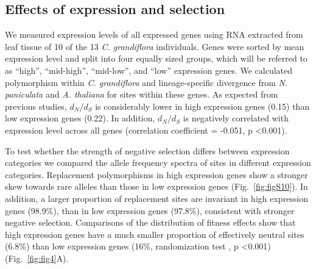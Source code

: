 \subsection{Effects of expression and selection}
We measured expression levels of all expressed genes using RNA extracted from leaf tissue of 10 of the 13 \textit{C. grandiflora} individuals. Genes were sorted by mean expression level and split into four equally sized groups, which will be referred to as “high”, “mid-high”, “mid-low”, and “low” expression genes. We calculated polymorphism within \textit{C. grandiflora} and lineage-specific divergence from \textit{N. paniculata} and \textit{A. thaliana} for sites within these genes. As expected from previous studies, $d_{N}/d_{S}$ is considerably lower in high expression genes (0.15) than low expression genes (0.22).  In addition, $d_{N}/d_{S}$ is negatively correlated with expression level across all genes (correlation coefficient = -0.051, p \textless 0.001).

To test whether the strength of negative selection differs between expression categories we compared the allele frequency spectra of sites in different expression categories. Replacement polymorphisms in high expression genes show a stronger skew towards rare alleles than those in low expression genes (Fig.~\ref{fig:figS10}). In addition, a larger proportion of replacement sites are invariant in high expression genes (98.9\%), than in low expression genes (97.8\%), consistent with stronger negative selection. Comparisons of the distribution of fitness effects show that high expression genes have a much smaller proportion of effectively neutral sites (6.8\%) than low expression genes (16\%, randomization test \citep{eyre2009}, p \textless  0.001) (Fig.~\ref{fig:fig4}A).  

